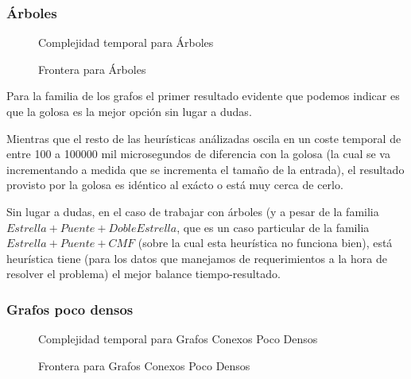 \subsubsection{\'Arboles}
\begin{figure}[H]
    \centering
    \fontsize{7}{10}\selectfont
    \resizebox{0.80\textwidth}{!}{}
    \caption{Complejidad temporal para \'Arboles}
\end{figure}

\begin{figure}[H]
    \centering
    \fontsize{7}{10}\selectfont
    \resizebox{0.80\textwidth}{!}{}
    \caption{Frontera para \'Arboles}
\end{figure}

\bigskip

\par Para la familia de los grafos el primer resultado evidente que podemos
    indicar es que la golosa es la mejor opci\'on sin lugar a dudas.

\par Mientras que el resto de las heur\'isticas an\'alizadas oscila en un
    coste temporal de entre 100 a 100000 mil microsegundos de diferencia
    con la golosa (la cual se va incrementando a medida que se incrementa
    el tama\~no de la entrada), el resultado provisto por la golosa
    es id\'entico al ex\'acto o est\'a muy cerca de cerlo.

\par Sin lugar a dudas, en el caso de trabajar con \'arboles (y a pesar
    de la familia $Estrella+Puente+Doble Estrella$, que es un caso
    particular de la familia $Estrella+Puente+CMF$ (sobre la cual
    esta heur\'istica no funciona bien), est\'a heur\'istica
    tiene (para los datos que manejamos de requerimientos a la hora
    de resolver el problema) el mejor balance tiempo-resultado.

\subsubsection{Grafos poco densos}
\begin{figure}[H]
    \centering
    \fontsize{7}{10}\selectfont
    \resizebox{0.80\textwidth}{!}{}
    \caption{Complejidad temporal para Grafos Conexos Poco Densos}
\end{figure}

\begin{figure}[H]
    \centering
    \fontsize{7}{10}\selectfont
    \resizebox{0.80\textwidth}{!}{}
    \caption{Frontera para Grafos Conexos Poco Densos}
\end{figure}

